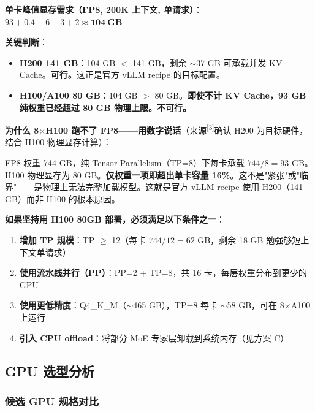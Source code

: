 \documentclass[UTF8,a4paper,10pt,oneside]{ctexart}
\begin{document}
\textbf{单卡峰值显存需求（FP8, 200K 上下文, 单请求）}：
$93 + 0.4 + 6 + 3 + 2 \approx \mathbf{104\ GB}$

\textbf{关键判断}：
\begin{itemize}
    \item \textbf{H200 141 GB}：104 GB $<$ 141 GB，剩余 $\sim$37 GB 可承载并发 KV Cache。\textbf{可行。}这正是官方 vLLM recipe 的目标配置。
    \item \textbf{H100/A100 80 GB}：104 GB $>$ 80 GB。\textbf{即使不计 KV Cache，93 GB 纯权重已经超过 80 GB 物理上限。不可行。}
\end{itemize}

\textbf{为什么 8$\times$H100 跑不了 FP8——用数字说话}（来源\textsuperscript{[3]}确认 H200 为目标硬件，结合 H100 物理显存计算）：

FP8 权重 744 GB，纯 Tensor Parallelism（TP=8）下每卡承载 $744/8 = 93\text{ GB}$。H100 物理显存为 80 GB。\textbf{仅权重一项即超出单卡容量 16\%}。这不是"紧张"或"临界"——是物理上无法完整加载模型。这就是官方 vLLM recipe 使用 H200（141 GB）而非 H100 的根本原因。

\textbf{如果坚持用 H100 80GB 部署，必须满足以下条件之一}：
\begin{enumerate}
    \item \textbf{增加 TP 规模}：TP $\geq$ 12（每卡 $744/12 = 62$ GB，剩余 18 GB 勉强够短上下文单请求）
    \item \textbf{使用流水线并行（PP）}：PP=2 + TP=8，共 16 卡，每层权重分布到更少的 GPU
    \item \textbf{使用更低精度}：Q4\_K\_M（$\sim$465 GB），TP=8 每卡 $\sim$58 GB，可在 8$\times$A100 上运行
    \item \textbf{引入 CPU offload}：将部分 MoE 专家层卸载到系统内存（见方案 C）
\end{enumerate}

\subsection{GPU 选型分析}

\subsubsection{候选 GPU 规格对比}
\end{document}
